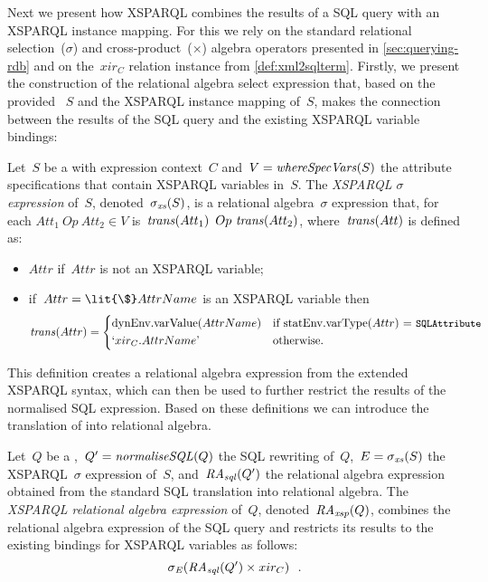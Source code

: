 Next we present how XSPARQL combines the results of a \ac{SQL} query with an XSPARQL instance mapping.
%
For this we rely on the standard relational selection~($\sigma$) and cross-product~($\times$) algebra operators
presented in \cref{sec:querying-rdb} and on the~$xir_C$ relation instance from \cref{def:xml2sqlterm}.
%
Firstly, we present the construction of the relational algebra select expression that, based on the provided
\SQLForClause~$S$ and the XSPARQL instance mapping of~$S$, makes the connection between the results of the \ac{SQL}
query and the existing XSPARQL variable bindings:
%
\begin{definition}
  \label{def:xsparql-join}
  Let~$S$ be a \SQLForClause with expression context~$C$ and~$V = \mathit{whereSpecVars}\!\left(S\right)$ the attribute
  specifications that contain XSPARQL variables in~$S$.
  The \emph{XSPARQL $\sigma$ expression} of~$S$, denoted~$\mathit{\sigma_{xs}}\!\left(S\right)$, is a relational algebra~$\sigma$
  expression that, for each $Att_1~Op~Att_2 \in V$ is~$\mathit{trans}\!\left(Att_1\right)~Op~\mathit{trans}\!\left(Att_2\right)$,
  where~$\mathit{trans}\!\left(Att\right)$ is defined as:
  \begin{itemize}[noitemsep]
  \item $Attr$ \hfill if~$Attr$ is not an XSPARQL variable;
  \item if~$Attr = \lit{\$}AttrName$ is an XSPARQL variable then 
    \[
    \funcCall{trans}{Attr} = \begin{dcases*}
        \dyn.\funcCall{\ecomp{varValue}}{AttrName} & if~\stat.\funcCall{\ecomp{varType}}{Attr} = \type{SQLAttribute}\\
        \textrm{`}xir_C.AttrName\textrm{'} & otherwise.
      \end{dcases*}
    \]
  \end{itemize}
\end{definition}
%
\noindent
%
This definition creates a relational algebra expression from the extended XSPARQL \SQLForClause syntax, which can then
be used to further restrict the results of the normalised \ac{SQL} expression.
%
Based on these definitions we can introduce the translation of  into relational algebra.
%
\begin{definition}
  \label{def:xsparql-sql-answers}
  Let~$Q$ be a \SQLForClause,~$Q' = \mathit{normaliseSQL}\!\left(Q\right)$ the \ac{SQL} rewriting of~$Q$,~$E =
  \mathit{\sigma_{xs}}\!\left(S\right)$ the XSPARQL~$\sigma$ expression of~$S$, and~$\mathit{RA_{\mathit{sql}}}\!\left(Q'\right)$ the relational algebra expression
  obtained from the standard \ac{SQL} translation into relational algebra.
  The \emph{XSPARQL relational algebra expression} of~$Q$, denoted~$\mathit{RA_{\mathit{xsp}}}\!\left(Q\right)$, combines the relational algebra
  expression of the \ac{SQL} query and restricts its results to the existing bindings for XSPARQL variables as follows:
  \[
  \mathit{\sigma_{E}}\!\left(\mathit{RA_{\mathit{sql}}}\!\left(Q'\right) \times xir_C\right) \enspace .
  \]
\end{definition}
